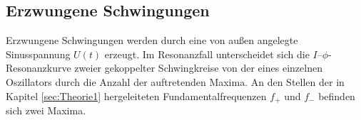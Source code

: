 \subsection{Erzwungene Schwingungen}
\label{sec:erzwungen}
Erzwungene Schwingungen werden durch eine von außen angelegte Sinusspannung $U(t)$ erzeugt.
Im Resonanzfall unterscheidet sich die $I–\phi$-Resonanzkurve zweier gekoppelter Schwingkreise von der eines einzelnen Oszillators durch die Anzahl der auftretenden Maxima. An den Stellen der in Kapitel \ref{sec:Theorie1} hergeleiteten Fundamentalfrequenzen $f_+$ und $f_-$ befinden sich zwei Maxima.
